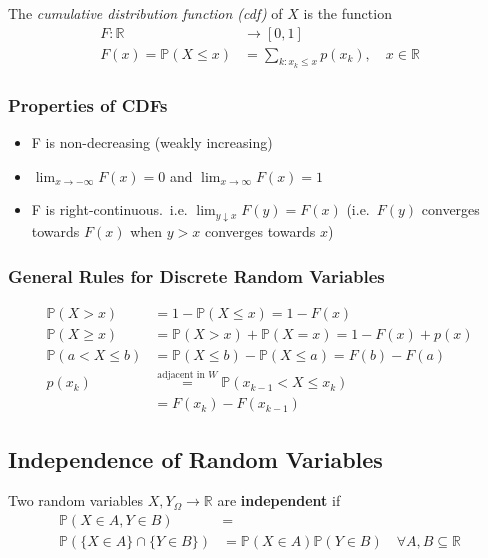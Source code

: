 \newpar{}

The \textit{cumulative distribution function (cdf)} of $X$ is the function
\noindent\begin{align*}
    F:\mathbb{R}            & \rightarrow [0,1]                             \\
    F(x)=\mathbb P(X\leq x) & =\sum_{k:x_k\leq x}p(x_k),\quad x\in\mathbb R
\end{align*}

\subsubsection{Properties of CDFs}
\begin{itemize}
    \item F is non-decreasing (weakly increasing)
    \item $\lim_{x\rightarrow -\infty}F(x)=0$ and $\lim_{x\rightarrow \infty}F(x)=1$
    \item F is right-continuous.\ i.e. $\lim_{y\downarrow x} F(y) =F(x)$ (i.e.\ $F(y)$ converges towards $F(x)$ when $y>x$ converges towards $x$)
\end{itemize}

\subsubsection{General Rules for Discrete Random Variables}
\noindent\begin{align*}
    \mathbb{P}(X>x)       & =1-\mathbb{P}(X\leq x)=1-F(x)                                   \\
    \mathbb{P}(X\geq x)   & =\mathbb{P}(X>x)+\mathbb{P}(X=x)=1-F(x)+p(x)                    \\
    \mathbb{P}(a<X\leq b) & =\mathbb{P}(X\leq b)-\mathbb{P}(X\leq a)=F(b)-F(a)              \\
    p(x_k)                & \overset{\text{adjacent in } W}{=}\mathbb{P}(x_{k-1}<X\leq x_k) \\
                          & =F(x_k)-F(x_{k-1})
\end{align*}

\subsection{Independence of Random Variables}
Two random variables $X,Y_\Omega \rightarrow\mathbb{R}$ are \textbf{independent} if
\noindent\begin{align*}
    \mathbb{P}(X\in A,Y\in B)            & =                                                                        \\
    \mathbb{P}(\{X\in A\}\cap\{Y\in B\}) & =\mathbb{P}(X\in A)\mathbb{P}(Y\in B)\quad\forall A,B\subseteq\mathbb{R}
\end{align*}

